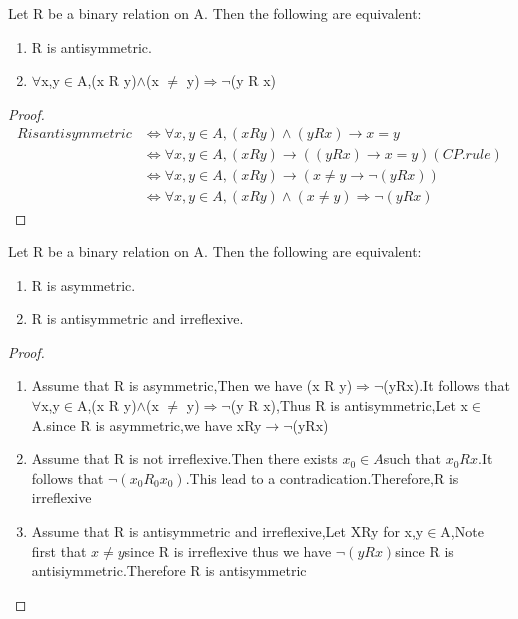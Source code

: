 \documentclass[cn,10pt,math=newtx,citestyle=gb7714-2015,bibstyle=gb7714-2015]{elegantbook}
\begin{document}
\begin{theorem}
    Let R be a binary relation on A. Then the
following are equivalent:
\begin{enumerate}
    \item R is antisymmetric.
    \item $\forall$x,y$\in$A,(x R y)$\land$(x $\neq$ y)$\Rightarrow$$\lnot$(y R x)
\end{enumerate}
\end{theorem}
\begin{proof}
    \begin{align*}
        R is antisymmetric &\Leftrightarrow \forall x,y \in A,(x R y)\land (y R x) \rightarrow x=y\\
        & \Leftrightarrow \forall x,y \in A,(x R y)\rightarrow ((y R x) \rightarrow x=y) (CP.rule)\\
        & \Leftrightarrow \forall x,y \in A,(x R y)\rightarrow (x\neq y\rightarrow \lnot (yRx))\\
        &  \Leftrightarrow \forall x,y \in A,(x R y) \land (x \neq y)\Rightarrow \lnot (y R x)
    \end{align*}
\end{proof}
\begin{theorem}
    Let R be a binary relation on A. Then the
following are equivalent:
\begin{enumerate}
    \item R is asymmetric.
    \item  R is antisymmetric and irreflexive.
\end{enumerate}

\end{theorem}
\newpage
\begin{proof}
    \begin{enumerate}
        \item Assume that R is asymmetric,Then we have (x R y)$\Rightarrow$$\lnot$(yRx).It follows that $\forall$x,y$\in$A,(x R y)$\land$(x $\neq$ y)$\Rightarrow$$\lnot$(y R x),Thus R is antisymmetric,Let x$\in$A.since R is asymmetric,we have xRy$\rightarrow \lnot$(yRx)
        \item Assume that R is not irreflexive.Then there exists $x_0\in A$such that $x_0Rx$.It follows that $\lnot (x_0R_0x_0)$.This lead to a contradication.Therefore,R is irreflexive
        \item Assume that R is antisymmetric and irreflexive,Let XRy for x,y$\in$A,Note first that $x\neq y$since R is irreflexive thus we have $\lnot (yRx)$since R is antisiymmetric.Therefore R is antisymmetric
    \end{enumerate}
\end{proof}
\end{document}
